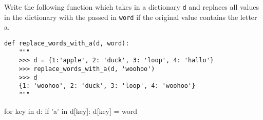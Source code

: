 \begin{blocksection}
\question Write the following function which takes in a dictionary \lstinline$d$ and replaces all values in the dictionary with the passed in \lstinline$word$ if the original value contains the letter a.

\begin{lstlisting}
def replace_words_with_a(d, word):
    """
    >>> d = {1:'apple', 2: 'duck', 3: 'loop', 4: 'hallo'}
    >>> replace_words_with_a(d, 'woohoo')
    >>> d
    {1: 'woohoo', 2: 'duck', 3: 'loop', 4: 'woohoo'}
    """
\end{lstlisting}

\begin{solution}[2in]
    for key in d:
        if 'a' in d[key]:
            d[key] = word

\end{solution}
\end{blocksection}
